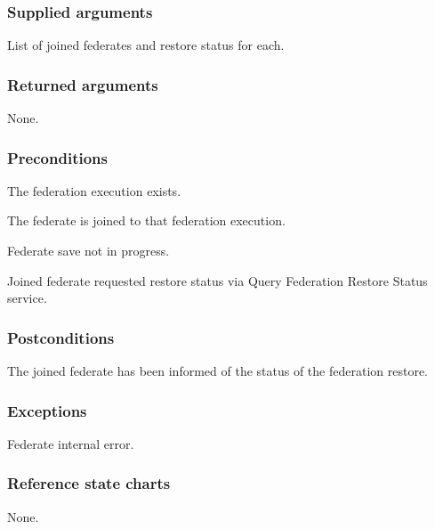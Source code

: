 \begin{compactstdpage}
    \subsubsection{Supplied arguments}

    \begin{stdalphalist}
        \item List of joined federates and restore status for each.
    \end{stdalphalist}

    \subsubsection{Returned arguments}

    \begin{stdalphalist}
        \item None.
    \end{stdalphalist}

    \subsubsection{Preconditions}

    \begin{stdalphalist}
        \item The federation execution exists.
        \item The federate is joined to that federation execution.
        \item Federate save not in progress.
        \item Joined federate requested restore status via Query Federation Restore Status service.
    \end{stdalphalist}

    \subsubsection{Postconditions}

    \begin{stdalphalist}
        \item The joined federate has been informed of the status of the federation restore.
    \end{stdalphalist}

    \subsubsection{Exceptions}

    \begin{stdalphalist}
        \item Federate internal error.
    \end{stdalphalist}

    \subsubsection{Reference state charts}

    \begin{stdalphalist}
        \item None.
    \end{stdalphalist}
\end{compactstdpage}
